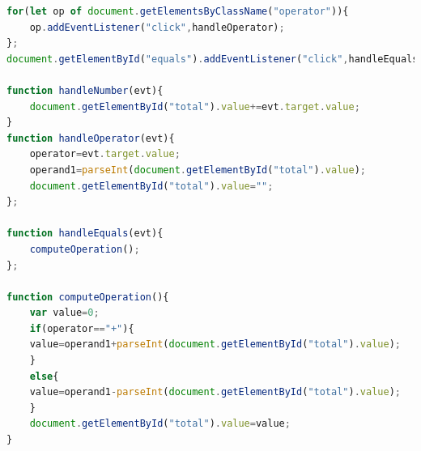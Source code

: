 \documentclass[a4paper,11pt]{exam}
\begin{document}
\begin{questions}
\begin{solutionorlines}[0cm]
\begin{lstlisting}[frame=leftline,language={JavaScript},numbers=none]
for(let op of document.getElementsByClassName("operator")){
	op.addEventListener("click",handleOperator);
};
document.getElementById("equals").addEventListener("click",handleEquals);

function handleNumber(evt){
	document.getElementById("total").value+=evt.target.value;
}
function handleOperator(evt){
	operator=evt.target.value;
	operand1=parseInt(document.getElementById("total").value);
	document.getElementById("total").value="";
};

function handleEquals(evt){
	computeOperation();
};

function computeOperation(){
	var value=0;
	if(operator=="+"){
	value=operand1+parseInt(document.getElementById("total").value);
	}
	else{
	value=operand1-parseInt(document.getElementById("total").value);
	}
	document.getElementById("total").value=value;
}
		    \end{lstlisting}
		\end{solutionorlines}

	\end{questions}

\newpage



\end{document}
